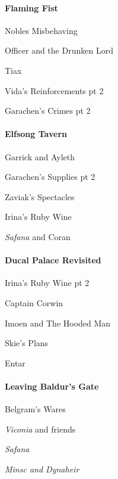\documentclass[10pt,a4,twoside]{book}
\begin{document}
\begin{multicols}{3}
\paragraph*{Flaming Fist}
\begin{trivlist}
\item Nobles Misbehaving
\item Officer and the Drunken Lord
\item Tiax
\item Vida's Reinforcements pt 2 %
\item Garachen's Crimes pt 2 %
\end{trivlist}

\paragraph*{Elfsong Tavern}
\begin{trivlist}
\item Garrick and Ayleth
\item Garachen's Supplies pt 2 %
\item Zaviak's Spectacles
\item Irina's Ruby Wine %
\item \textit{Safana} and Coran
\end{trivlist}

\paragraph*{Ducal Palace Revisited}
\begin{trivlist}
\item Irina's Ruby Wine pt 2 %

\item Captain Corwin

\item Imoen and The Hooded Man
\item Skie's Plans

\item Entar \\%
\end{trivlist}
\paragraph*{Leaving Baldur's Gate}
\begin{trivlist}
\item Belgram's Wares
\item \emph{Viconia} and friends 
\item \emph{Safana}
\item \emph{Minsc and Dynaheir} %


\end{trivlist}
\end{multicols}
\end{document}
